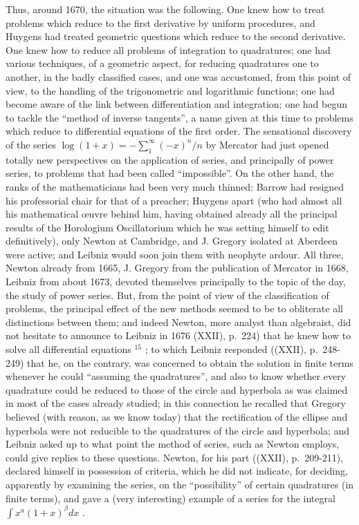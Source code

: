Thus, around 1670, the situation was the following. One knew how to treat problems which reduce to the first derivative by uniform procedures, and Huygens had treated geometric questions which reduce to the second derivative. One knew how to reduce all problems of integration to quadratures; one had various techniques, of a geometric aspect, for reducing quadratures one to another, in the badly classified cases, and one was accustomed, from this point of view, to the handling of the trigonometric and logarithmic functions; one had become aware of the link between differentiation and integration; one had begun to tackle the ``method of inverse tangents'', a name given at this time to problems which reduce to differential equations of the first order. The sensational discovery of the series \(\log(1+x)=-\sum_{1}^{\infty}(-x)^{n}/n\) by Mercator had just opened totally new perspectives on the application of series, and principally of power series, to problems that had been called ``impossible''. On the other hand, the ranks of the mathematicians had been very much thinned: Barrow had resigned his professorial chair for that of a preacher; Huygens apart (who had almost all his mathematical œuvre behind him, having obtained already all the principal results of the Horologium Oscillatorium which he was setting himself to edit definitively), only Newton at Cambridge, and J. Gregory isolated at Aberdeen were active; and Leibniz would soon join them with neophyte ardour. All three, Newton already from 1665, J. Gregory from the publication of Mercator in 1668, Leibniz from about 1673, devoted themselves principally to the topic of the day, the study of power series. But, from the point of view of the classification of problems, the principal effect of the new methods seemed to be to obliterate all distinctions between them; and indeed Newton, more analyst than algebraist, did not hesitate to announce to Leibniz in 1676 (XXII), p.~224) that he knew how to solve all differential equations \({}^{15}\) ; to which Leibniz responded ((XXII), p.~248-249) that he, on the contrary, was concerned to obtain the solution in finite terms whenever he could ``assuming the quadratures'', and also to know whether every quadrature could be reduced to those of the circle and hyperbola as was claimed in most of the cases already studied; in this connection he recalled that Gregory believed (with reason, as we know today) that the rectification of the ellipse and hyperbola were not reducible to the quadratures of the circle and hyperbola; and Leibniz asked up to what point the method of series, such as Newton employs, could give replies to these questions. Newton, for his part ((XXII), p.~209-211), declared himself in possession of criteria, which he did not indicate, for deciding, apparently by examining the series, on the ``possibility'' of certain quadratures (in finite terms), and gave a (very interesting) example of a series for the integral \(\int x^{a}(1+x)^{\beta}dx\) .

